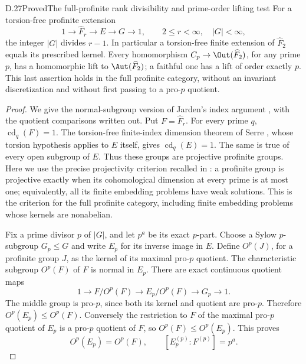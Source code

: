 \begin{claim}{D.27}{Proved}{The full-profinite rank divisibility and prime-order lifting test}
For a torsion-free profinite extension
\[
 1\longrightarrow\widehat F_r\longrightarrow E
   \longrightarrow G\longrightarrow1,
 \qquad 2\le r<\infty,\quad |G|<\infty,
\]
the integer $|G|$ divides $r-1$. In particular a torsion-free
finite extension of $\widehat F_2$ equals its prescribed kernel.
Every homomorphism $C_p\to\Out(\widehat F_2)$, for any prime $p$,
has a homomorphic lift to $\Aut(\widehat F_2)$; a faithful one has
a lift of order exactly $p$. This last assertion holds in the full
profinite category, without an invariant discretization and without
first passing to a pro-$p$ quotient.
\end{claim}
\begin{proof}
We give the normal-subgroup version of Jarden's index argument
\cite[Theorems 1.2 and 4.1, pp.~496--498]{R-Jarden1982}, with the
quotient comparisons written out. Put $F=\widehat F_r$. For every
prime $q$, $\operatorname{cd}_q(F)=1$. The torsion-free finite-index
dimension theorem of Serre \cite[\S1]{R-SerreCD}, whose torsion
hypothesis applies to $E$ itself, gives $\operatorname{cd}_q(E)=1$.
The same is true of every open subgroup of $E$. Thus these groups
are projective profinite groups. Here we use the precise
projectivity criterion recalled in \cite[\S2]{R-Jarden1982}:
a profinite group is projective exactly when its cohomological
dimension at every prime is at most one; equivalently, all its
finite embedding problems have weak solutions. This is the
criterion for the full profinite category, including finite
embedding problems whose kernels are nonabelian.

Fix a prime divisor $p$ of $|G|$, and let $p^a$ be its exact
$p$-part. Choose a Sylow $p$-subgroup $G_p\le G$ and write
$E_p$ for its inverse image in $E$. Define $O^p(J)$, for a
profinite group $J$, as the kernel of its maximal pro-$p$ quotient.
The characteristic subgroup $O^p(F)$ of $F$ is normal in $E_p$.
There are exact continuous quotient maps
\[
 1\longrightarrow F/O^p(F)\longrightarrow E_p/O^p(F)
 \longrightarrow G_p\longrightarrow1.
\]
The middle group is pro-$p$, since both its kernel and quotient
are pro-$p$. Therefore $O^p(E_p)\le O^p(F)$. Conversely the
restriction to $F$ of the maximal pro-$p$ quotient of $E_p$ is a
pro-$p$ quotient of $F$, so $O^p(F)\le O^p(E_p)$. This proves
\[
 O^p(E_p)=O^p(F),\qquad
 [E_p^{(p)}:F^{(p)}]=p^a.                         \tag{D.27a}
\]


\end{proof}
